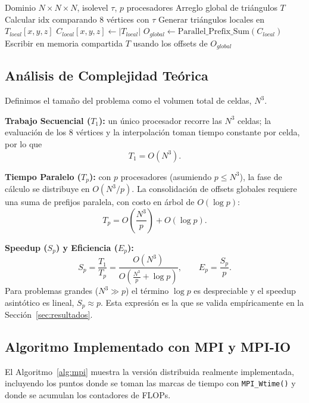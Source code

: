 \documentclass[conference]{IEEEtran}
\begin{document}
\begin{algorithm}[H]
\caption{Marching Cubes Teórico (CREW PRAM)}
\label{alg:pram}
\renewcommand{\algorithmicdo}{}
\begin{algorithmic}[1]
\REQUIRE Dominio $N \times N \times N$, isolevel $\tau$, $p$ procesadores
\ENSURE Arreglo global de triángulos $T$
            \STATE Calcular $\mathrm{idx}$ comparando 8 vértices con $\tau$
                \STATE Generar triángulos locales en $T_{local}[x,y,z]$
                \STATE $C_{local}[x,y,z] \leftarrow |T_{local}|$
            \ENDIF
        \ENDFOR
    \ENDFOR
\ENDFOR
\STATE $O_{global} \leftarrow \text{Parallel\_Prefix\_Sum}(C_{local})$
\STATE Escribir en memoria compartida $T$ usando los offsets de $O_{global}$
\end{algorithmic}
\end{algorithm}

\subsection{Análisis de Complejidad Teórica}
Definimos el tamaño del problema como el volumen total de celdas, $N^3$.

\textbf{Trabajo Secuencial ($T_1$):} un único procesador recorre las $N^3$ celdas; la evaluación de los 8 vértices y la interpolación toman tiempo constante por celda, por lo que
$$T_1 = O(N^3).$$

\textbf{Tiempo Paralelo ($T_p$):} con $p$ procesadores (asumiendo $p \le N^3$), la fase de cálculo se distribuye en $O(N^3/p)$. La consolidación de offsets globales requiere una suma de prefijos paralela, con costo en árbol de $O(\log p)$:
$$T_p = O\left(\frac{N^3}{p}\right) + O(\log p).$$

\textbf{Speedup ($S_p$) y Eficiencia ($E_p$):}
$$S_p = \frac{T_1}{T_p} = \frac{O(N^3)}{O\left(\frac{N^3}{p} + \log p\right)}, \qquad E_p = \frac{S_p}{p}.$$
Para problemas grandes ($N^3 \gg p$) el término $\log p$ es despreciable y el speedup asintótico es lineal, $S_p \approx p$. Esta expresión es la que se valida empíricamente en la Sección~\ref{sec:resultados}.

\subsection{Algoritmo Implementado con MPI y MPI-IO}
El Algoritmo~\ref{alg:mpi} muestra la versión distribuida realmente implementada, incluyendo los puntos donde se toman las marcas de tiempo con \texttt{MPI\_Wtime()} y donde se acumulan los contadores de FLOPs.
\end{document}
